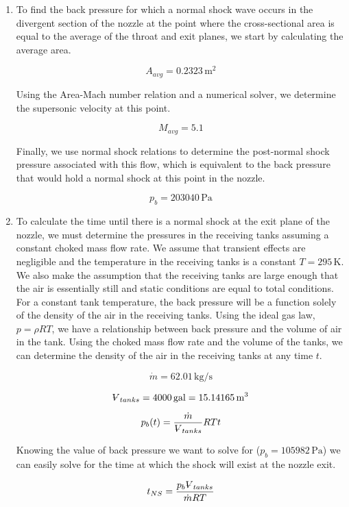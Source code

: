 \documentclass[../main.tex]{subfiles}
\begin{document}
\begin{enumerate}[label=(\alph*)]
    \item To find the back pressure for which a normal shock wave occurs in the divergent section of the nozzle at the point where the cross-sectional area is equal to the average of the throat and exit planes, we start by calculating the average area.
    
    \[
        A_{avg} = 0.2323 \, \unit{\meter\squared}
    \]

    Using the Area-Mach number relation and a numerical solver, we determine the supersonic velocity at this point.

    \[
        M_{avg} = 5.1  
    \]
    
    Finally, we use normal shock relations to determine the post-normal shock pressure associated with this flow, which is equivalent to the back pressure that would hold a normal shock at this point in the nozzle.

    \[
        \boxed{p_b = 203040\, \unit{\pascal}}  
    \]

    \item To calculate the time until there is a normal shock at the exit plane of the nozzle, we must determine the pressures in the receiving tanks assuming a constant choked mass flow rate.
    We assume that transient effects are negligible and the temperature in the receiving tanks is a constant \(T=295\,\unit{\kelvin}\).
    We also make the assumption that the receiving tanks are large enough that the air is essentially still and static conditions are equal to total conditions.
    For a constant tank temperature, the back pressure will be a function solely of the density of the air in the receiving tanks.
    Using the ideal gas law, \(p = \rho R T\), we have a relationship between back pressure and the volume of air in the tank. 
    Using the choked mass flow rate and the volume of the tanks, we can determine the density of the air in the receiving tanks at any time \(t\).

    \[
        \dot{m} = 62.01 \,\unit{\kilogram/\second}
    \]

    \[
        \volume_{tanks} = 4000 \, \unit{gal} = 15.14165\,\unit{\meter\cubed}
    \]

    \[
        p_b(t) = \frac{\dot{m}}{\volume_{tanks}}R T t
    \]

    Knowing the value of back pressure we want to solve for (\(p_b = 105982 \, \unit{\pascal}\)) we can easily solve for the time at which the shock will exist at the nozzle exit.

    \[
        t_{NS} = \frac{p_b \volume_{tanks}}{\dot{m} R T}  
    \]


\end{enumerate}
\end{document}
